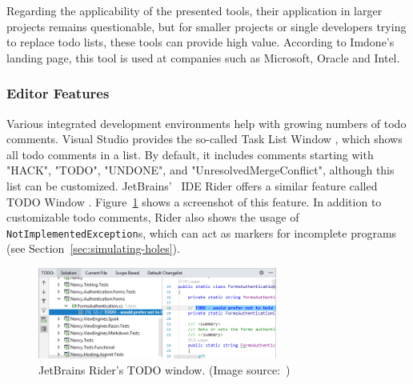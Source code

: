 Regarding the applicability of the presented tools, their application in larger projects remains questionable, but for smaller projects or single developers trying to replace todo lists, these tools can provide high value.
According to Imdone's landing page, this tool is used at companies such as Microsoft, Oracle and Intel.

\subsubsection{Editor Features}
\label{sec:todo-comments-ide-features}
Various integrated development environments help with growing numbers of todo comments.
Visual Studio provides the so-called Task List Window \cite{hogensen_use_2019}, which shows all todo comments in a list.
By default, it includes comments starting with "HACK", "TODO", "UNDONE", and "UnresolvedMergeConflict", although this list can be customized.
JetBrains' \CS\ IDE Rider offers a similar feature called TODO Window \cite{jetbrains_todo_2023}.
Figure~\ref{fig:rider-todo-list} shows a screenshot of this feature.
In addition to customizable todo comments, Rider also shows the usage of \texttt{NotImplementedException}s, which can act as markers for incomplete programs (see Section~\ref{sec:simulating-holes}).
%
\begin{figure}
    \centering
    \includegraphics[width=0.7\textwidth]{images/rider-todo-window}
    \caption{JetBrains Rider's TODO window. (Image source:~\cite{searls_todo_2023})}
    \label{fig:rider-todo-list}
\end{figure}

